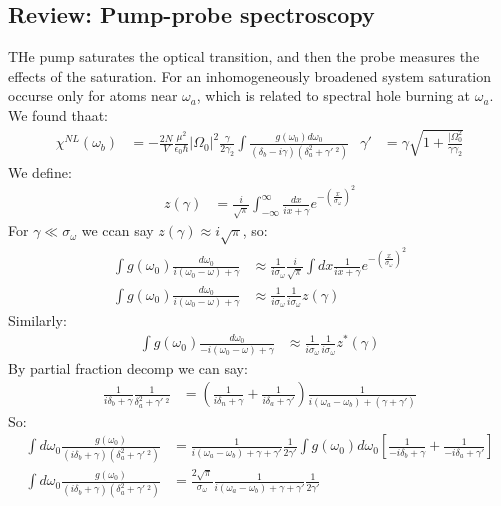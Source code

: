 \subsection*{Review: Pump-probe spectroscopy}
THe pump saturates the optical transition, and then the probe measures the effects of the saturation.
For an inhomogeneously broadened system saturation occurse only for atoms near $\omega_a$, which is related to spectral hole burning at $\omega_a$. 
We found thaat:
\begin{align*}
	\chi^{NL}(\omega_b) &= - \frac{2N}{V} \frac{\mu^2}{\epsilon_0\hbar} |\Omega_0|^2 \frac{\gamma}{2\gamma_2} \int \frac{g(\omega_0) d\omega_0}{(\delta_b - i\gamma)(\delta_a^2 + \gamma'\ ^2)} &
	\gamma' &= \gamma\sqrt{1 + \frac{|\Omega_0^2}{\gamma\gamma_2}}
\end{align*}
We define:
\begin{align*}
	z(\gamma) &= \frac{i}{\sqrt{\pi}} \int_{-\infty}^\infty \frac{dx}{ix + \gamma} e^{-\left(\frac{x}{\sigma_\omega}\right)^2}
\end{align*}
For $\gamma \ll \sigma_\omega$ we ccan say $z(\gamma) \approx i\sqrt{\pi}$, so:
\begin{align*}
	\int g(\omega_0) \frac{d\omega_0}{i(\omega_0 -\omega) + \gamma} &\approx \frac{1}{i\sigma_\omega} \frac{i}{\sqrt{\pi}} \int dx \frac{1}{ix + \gamma} e ^{-\left(\frac{x}{\sigma_\omega}\right)^2} \\
	\int g(\omega_0) \frac{d\omega_0}{i(\omega_0 -\omega) + \gamma} &\approx \frac{1}{i\sigma_\omega} \frac{1}{i\sigma_\omega} z(\gamma)
\end{align*}
Similarly:
\begin{align*}
	\int g(\omega_0) \frac{d\omega_0}{-i(\omega_0 -\omega) + \gamma} &\approx \frac{1}{i\sigma_\omega} \frac{1}{i\sigma_\omega} z^*(\gamma)
\end{align*}
By partial fraction decomp we can say:
\begin{align*}
	\frac{1}{i\delta_b + \gamma} \frac{1}{\delta_a^2 + \gamma'\ ^2} &= \left( \frac{1}{i\delta_n + \gamma} + \frac{1}{i\delta_a + \gamma'}\right)\frac{1}{i(\omega_a - \omega_b) + (\gamma + \gamma')}
\end{align*}
So:
\begin{align*}
	\int d\omega_0 \frac{g(\omega_0)}{(i\delta_b + \gamma)(\delta_a^2 + \gamma'\ ^2)} &= \frac{1}{i(\omega_a - \omega_b) + \gamma + \gamma'} \frac{1}{2\gamma'} \int g(\omega_0)d\omega_0\left[\frac{1}{-i\delta_b + \gamma} + \frac{1}{-i\delta_a + \gamma'}\right] \\
	\int d\omega_0 \frac{g(\omega_0)}{(i\delta_b + \gamma)(\delta_a^2 + \gamma'\ ^2)} &= \frac{2\sqrt{\pi}}{\sigma_\omega} \frac{1}{i(\omega_a -\omega_b) + \gamma + \gamma'} \frac{1}{2\gamma'}
\end{align*}
